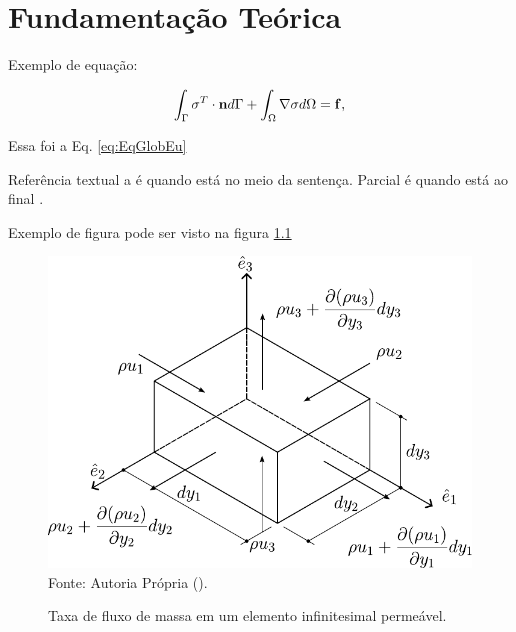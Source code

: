 \documentclass[_ArquivoPrincipal.tex]{subfiles}
\begin{document}
\chapter{Fundamentação Teórica} \label{FT}

Exemplo de equação:


\begin{equation}
    \begin{centering}
    \int_\Gamma{\sigma^T\cdot \mathbf{n}d\Gamma}+\int_\Omega{\nabla \sigma d\Omega}=\mathbf{f}
    \text{,}
    \end{centering}
    \label{eq:EqGlobEu}
\end{equation}

Essa foi a Eq. \eqref{eq:EqGlobEu}

Referência textual a  é quando está no meio da sentença. Parcial é quando está ao final \cite{tezduyar1991stabilized}.

Exemplo de figura pode ser visto na figura \ref{fig:BalMas}

\begin{figure}[h]
    \centering
    \caption{Taxa de fluxo de massa em um elemento infinitesimal permeável.}
    \includegraphics[width=.5\linewidth]{Figuras/BalMas.pdf}
    \\Fonte: Autoria Própria (\the\year).
    \label{fig:BalMas}
\end{figure}
\end{document}
